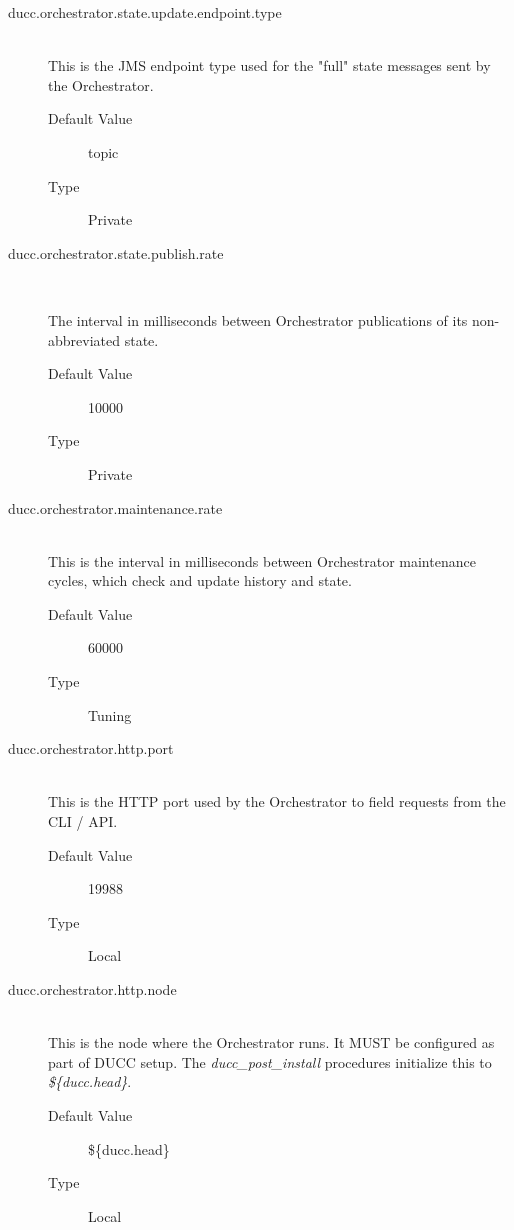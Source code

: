 \begin{description}
      \item[ducc.orchestrator.state.update.endpoint.type] \hfill \\
        This is the JMS endpoint type used for the "full" state messages sent by the Orchestrator. 
        \begin{description}
          \item[Default Value] topic 
          \item[Type] Private
        \end{description} 
        
      \item[ducc.orchestrator.state.publish.rate] \hfill \\
          \label{itm:props-or.state.publish.rate}

        The interval in milliseconds between Orchestrator publications of its non-abbreviated  
        state. 
        \begin{description}
          \item[Default Value] 10000 
          \item[Type] Private 
        \end{description}

      \item[ducc.orchestrator.maintenance.rate] \hfill \\
        This is the interval in milliseconds between Orchestrator maintenance cycles, which check
        and update history and state. 
        \begin{description}
          \item[Default Value] 60000 
          \item[Type] Tuning 
        \end{description}
        
      \item[ducc.orchestrator.http.port] \hfill \\
        This is the HTTP port used by the Orchestrator to field requests from the CLI / API. 
        \begin{description}          
          \item[Default Value] 19988
          \item[Type] Local 
        \end{description}
        
      \item[ducc.orchestrator.http.node] \hfill \\
        This is the node where the Orchestrator runs. It MUST be configured as part of DUCC 
        setup. The {\em ducc\_post\_install} procedures initialize this to {\em \$\{ducc.head\}}.
        \begin{description}
          \item[Default Value] \$\{ducc.head\}
          \item[Type] Local 
        \end{description}
        

\end{description}
